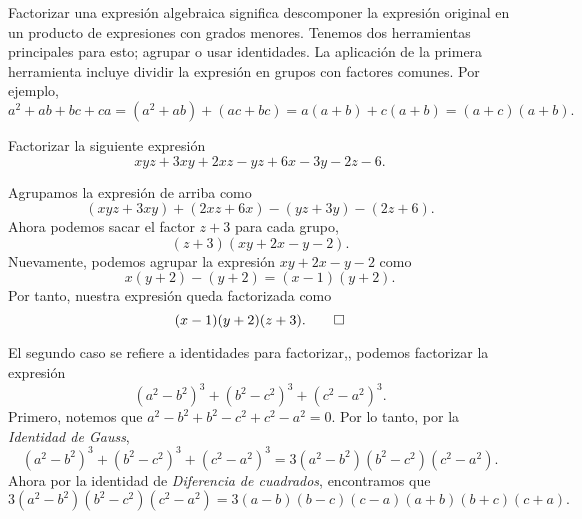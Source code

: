 Factorizar una expresión algebraica significa descomponer la expresión original en un producto de expresiones con grados menores.
Tenemos dos herramientas principales para esto; agrupar o usar identidades.
La aplicación de la primera herramienta incluye dividir la expresión en grupos con factores comunes.
Por ejemplo,
\[
    a^2 + ab + bc + ca = (a^2 + ab) + (ac + bc) = a(a + b) + c(a + b) = (a + c)(a + b).
\]

\begin{example}
    Factorizar la siguiente expresión
    \[
        xyz + 3xy + 2xz - yz + 6x - 3y - 2z - 6.
    \]
\end{example}
\begin{solution}
    Agrupamos la expresión de arriba como
    \[
        (xyz + 3xy) + (2xz + 6x) - (yz + 3y) - (2z + 6).
    \]
    Ahora podemos sacar el factor $z + 3$ para cada grupo,
    \[
        (z + 3)(xy + 2x - y - 2).
    \]
    Nuevamente, podemos agrupar la expresión $xy + 2x - y - 2$ como
    \[
        x(y + 2) - (y + 2) = (x - 1)(y + 2).
    \]
    Por tanto, nuestra expresión queda factorizada como
    \[
        (x - 1)(y + 2)(z + 3). \qedhere
    \]
\end{solution}

El segundo caso se refiere a identidades para factorizar,\eg, podemos factorizar la expresión
\[
    (a^2 - b^2)^3 + (b^2 - c^2)^3 + (c^2 - a^2)^3.
\]
Primero, notemos que $a^2 - b^2 + b^2 - c^2 + c^2 - a^2 = 0$.
Por lo tanto, por la \textit{Identidad de Gauss},
\[
    (a^2 - b^2)^3 + (b^2 - c^2)^3 + (c^2 - a^2)^3 = 3 (a^2 - b^2)(b^2 - c^2)(c^2 - a^2).
\]
Ahora por la identidad de \textit{Diferencia de cuadrados}, encontramos que
\[
    3 (a^2 - b^2)(b^2 - c^2)(c^2 - a^2) = 3 (a - b)(b - c)(c - a) (a + b)(b + c)(c + a).
\]

